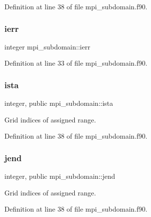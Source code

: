 Definition at line 38 of file mpi\+\_\+subdomain.\+f90.

\mbox{\label{namespacempi__subdomain_acd16f258caed20a7d8d38cd28ae64688}} 
\subsubsection{\texorpdfstring{ierr}{ierr}}
{\footnotesize\ttfamily integer mpi\+\_\+subdomain\+::ierr}



Definition at line 33 of file mpi\+\_\+subdomain.\+f90.

\mbox{\label{namespacempi__subdomain_ab8925faaa6f45326c1d11efa37e03566}} 
\subsubsection{\texorpdfstring{ista}{ista}}
{\footnotesize\ttfamily integer, public mpi\+\_\+subdomain\+::ista}



Grid indices of assigned range. 



Definition at line 38 of file mpi\+\_\+subdomain.\+f90.

\mbox{\label{namespacempi__subdomain_a06433a0d1a081c51202a0010c21c9d36}} 
\subsubsection{\texorpdfstring{jend}{jend}}
{\footnotesize\ttfamily integer, public mpi\+\_\+subdomain\+::jend}



Grid indices of assigned range. 



Definition at line 38 of file mpi\+\_\+subdomain.\+f90.

\mbox{\label{namespacempi__subdomain_ac22380b1c941dd6c53cabe7287d185e9}} 
